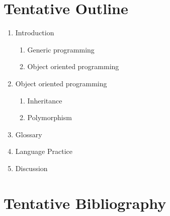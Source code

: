 \section*{Tentative Outline}
\begin{enumerate} [label=\Roman*.]
\item Introduction
\begin{enumerate} [label=\Alph*.]
\item Generic programming
\item Object oriented programming
\end{enumerate}
\item Object oriented programming
\begin{enumerate}
\item Inheritance
\item Polymorphism
\end{enumerate}
\item Glossary
\item Language Practice
\item Discussion
\end{enumerate}
\section*{Tentative Bibliography}
\nocite{*}
\printbibliography[heading=none]

